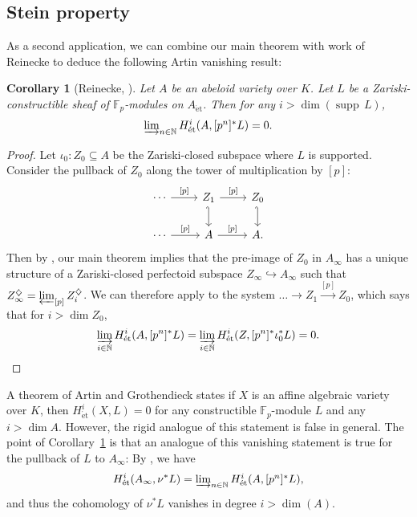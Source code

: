\documentclass[10pt,oneside]{amsart}
\newtheorem{corollary}[theorem]{Corollary}
\theoremstyle{definition}
\newcommand{\supp}{{\operatorname{supp}\,}}
\newcommand{\et}{\operatorname{\acute{e}t}}
\newcommand{\proet}{\operatorname{pro\acute{e}t}}
\renewcommand{\O}{\mathcal{O}}
\newcommand{\N}{\mathbb{N}}
\newcommand{\F}{\mathbb{F}}
\begin{document}
	\subsection{Stein property}
	As a second application, we can combine our main theorem with work of Reinecke to deduce the following Artin vanishing result:
	\begin{corollary}[{Reinecke, \cite[Theorem~3.3]{Reinecke}}]\label{c:Reinecke}
		Let $A$ be an abeloid variety over $K$. Let $L$ be a Zariski-constructible sheaf of $\mathbb F_p$-modules on $A_{\et}$. Then for any $i>\dim(\supp L)$,
		\[\textstyle\varinjlim_{n\in \mathbb N}H_{\et}^i(A,[p^n]^{\ast}L)=0.\]
	\end{corollary}
	\begin{proof}
		Let $\iota_0:Z_0\subseteq A$ be the Zariski-closed subspace where $L$ is supported. Consider the pullback of $Z_0$ along the tower of multiplication by $[p]$:
		\[
		\begin{tikzcd}
			\cdots \arrow[r, "{[p]}"] & Z_1 \arrow[d,hook'] \arrow[r, "{[p]}"] & Z_0 \arrow[d,hook'] \\
			\cdots \arrow[r, "{[p]}"] & A \arrow[r, "{[p]}"]             & A.            
		\end{tikzcd}\]
	Then by \cite[Lemma 2.2.2]{torsion}, our main theorem implies that the pre-image of $Z_0$ in $A_\infty$ has a unique structure of a Zariski-closed perfectoid subspace $Z_\infty\hookrightarrow A_\infty$ such that $Z_\infty^{\diamondsuit}=\varprojlim_{[p]} Z_i^{\diamondsuit}$. We can therefore apply \cite[Theorem~3.3]{Reinecke} to the system $\dots \rightarrow Z_1\xrightarrow{[p]}Z_0$, which says that for $i>\dim Z_0$,
	\[ \varinjlim_{i\in \N}H^i_{\et}(A,[p^n]^{\ast}L)=\varinjlim_{i\in \N}H^i_{\et}(Z,[p^n]^{\ast}\iota_0^{\ast}L)=0.\qedhere\]
	\end{proof}
	A theorem of Artin and Grothendieck states if $X$ is an affine algebraic variety over $K$, then $H_{\et}^i(X,L)=0$ for any constructible $\mathbb F_p$-module $L$ and any $i>\dim A$. However, the rigid analogue of this statement is false in general. The point of Corollary~\ref{c:Reinecke} is that an analogue of this vanishing statement is true for the pullback of $L$ to $A_\infty$: By \cite[Proposition 14.9]{etale_cohomology_of_diamonds}, we have
\[H^i_{\et}(A_\infty,\nu^{\ast}L)=\textstyle\varinjlim_{n\in\N} H^i_{\et}(A,[p^n]^{\ast}L),\]
and thus the cohomology of $\nu^{\ast}L$ vanishes in degree $i>\dim(A)$.
	\begin{comment}
	Let us sketch a proof that the left hand side vanishes  for $i>\dim A$: One first reduces to the case that $L$ is locally constant.
	Since $A$ is proper and smooth, one can use the Primitive Comparison Theorem \cite[Theorem~5.1]{p-adic_Hodge} \cite[Theorem~3.13]{survey} to reduce to showing that $H^i_{\proet}(A_\infty,\nu^{\ast}L\otimes_{\F_p} \O_{A_{\et}}^+/p)$ is almost zero for $i>d$. For this one can use that $H^j(V,\nu^{\ast}L\otimes_{\F_p} \O_{A_{\et}}^+/p)^a=0$ for any small enough affinoid perfectoid open $V\subseteq A_\infty$ and any $j>0$. This reduces the desired statement to a computation in \v{C}ech cohomology, which indeed vanishes in degree $>\dim A$.
	\end{comment}
\end{document}
